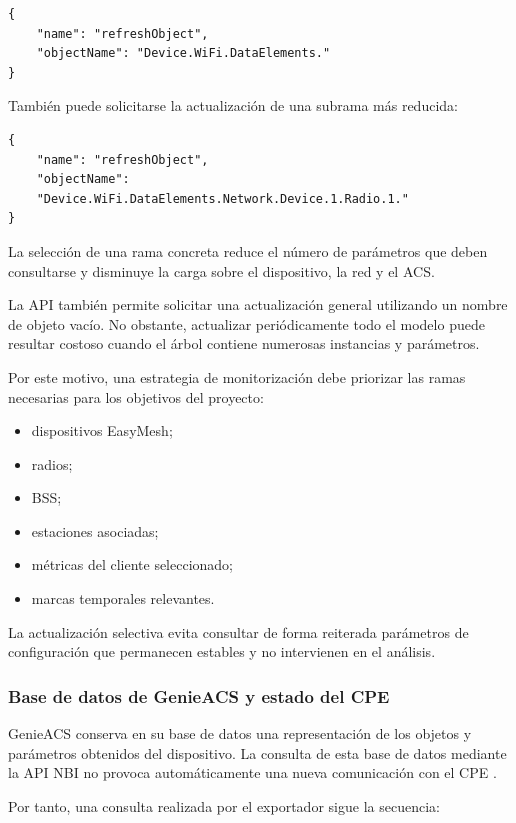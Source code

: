 \begin{verbatim}
{
    "name": "refreshObject",
    "objectName": "Device.WiFi.DataElements."
}
\end{verbatim}

También puede solicitarse la actualización de una subrama más reducida:

\begin{verbatim}
{
    "name": "refreshObject",
    "objectName":
    "Device.WiFi.DataElements.Network.Device.1.Radio.1."
}
\end{verbatim}

La selección de una rama concreta reduce el número de parámetros que
deben consultarse y disminuye la carga sobre el dispositivo, la red y el
ACS.

La API también permite solicitar una actualización general utilizando un
nombre de objeto vacío. No obstante, actualizar periódicamente todo el
modelo puede resultar costoso cuando el árbol contiene numerosas
instancias y parámetros.

Por este motivo, una estrategia de monitorización debe priorizar las
ramas necesarias para los objetivos del proyecto:

\begin{itemize}
    \item dispositivos EasyMesh;
    \item radios;
    \item BSS;
    \item estaciones asociadas;
    \item métricas del cliente seleccionado;
    \item marcas temporales relevantes.
\end{itemize}

La actualización selectiva evita consultar de forma reiterada parámetros
de configuración que permanecen estables y no intervienen en el análisis.


\subsubsection*{Base de datos de GenieACS y estado del CPE}

GenieACS conserva en su base de datos una representación de los objetos y
parámetros obtenidos del dispositivo. La consulta de esta base de datos
mediante la API NBI no provoca automáticamente una nueva comunicación con
el CPE \cite{genieacs_api}.

Por tanto, una consulta realizada por el exportador sigue la secuencia:

